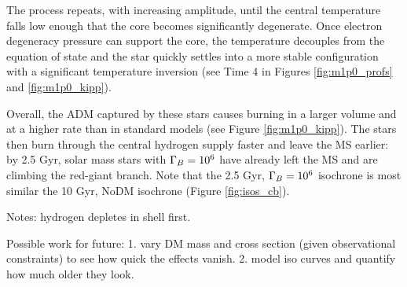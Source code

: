 \documentclass[useAMS,usenatbib]{mnras}
\begin{document}
  The process repeats, with increasing amplitude, until the central temperature falls low enough that the core becomes significantly degenerate. Once electron degeneracy pressure can support the core, the temperature decouples from the equation of state and the star quickly settles into a more stable configuration with a significant temperature inversion (see Time 4 in Figures \ref{fig:m1p0_profs} and \ref{fig:m1p0_kipp}).

  Overall, the ADM captured by these stars causes burning in a larger volume and at a higher rate than in standard models (see Figure \ref{fig:m1p0_kipp}). The stars then burn through the central hydrogen supply faster and leave the MS earlier: by 2.5 Gyr, solar mass stars with $\Gamma_B = 10^{6}$ have already left the MS and are climbing the red-giant branch. Note that the 2.5 Gyr, $\Gamma_B = 10^{6}$ isochrone is most similar the 10 Gyr, NoDM isochrone (Figure \ref{fig:isos_cb}).


  Notes:
  hydrogen depletes in shell first.


  Possible work for future: 1. vary DM mass and cross section (given observational constraints) to see how quick the effects vanish. 2. model iso curves and quantify how much older they look.




\end{document}
